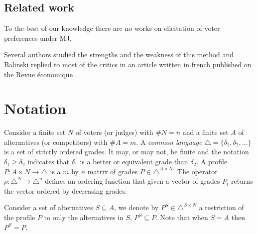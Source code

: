 \documentclass[version=3.21, pagesize, twoside=off, bibliography=totoc, DIV=calc, fontsize=12pt, a4paper]{scrartcl}
\begin{document}
\subsection{Related work}

To the best of our knowledge there are no works on elicitation of voter preferences under \acs{MJ}.

Several authors studied the strengths and the weakness of this method \citep{Felsenthal2008,Laslier2018} and Balinski replied to most of the critics in an article written in french published on the Revue économique \citep{Balinski2019}.




\section{Notation}
\label{sec:complete}
Consider a finite set $N$ of voters (or judges) with $\#N=n$ and a finite set $A$ of alternatives (or competitors) with $\#A=m$. 
A \textit{common language} $\triangle = \{ \delta_1, \delta_2, \dots \}$ is a set of strictly ordered grades. It may, or may not, be finite and the notation $\delta_1 \geq \delta_2$ indicates that $\delta_1$ is a better or equivalent grade than $\delta_2$. A profile $P : A\times N \rightarrow \triangle$ is a $m$ by $n$ matrix of grades $P \in \triangle^{A \times N}$. The operator $\rho: \triangle^{N} \rightarrow \triangle^n$ defines an ordering function that given a vector of grades $P_i$ returns the vector ordered by decreasing grades.

Consider a set of alternatives $S\subseteq A$,
we denote by $P^S \in \triangle^{S \times N}$ a restriction of the profile $P$ to only the alternatives in $S$, $P^S \subseteq P$. Note that when $S=A$ then $P^S=P$.
\end{document}
